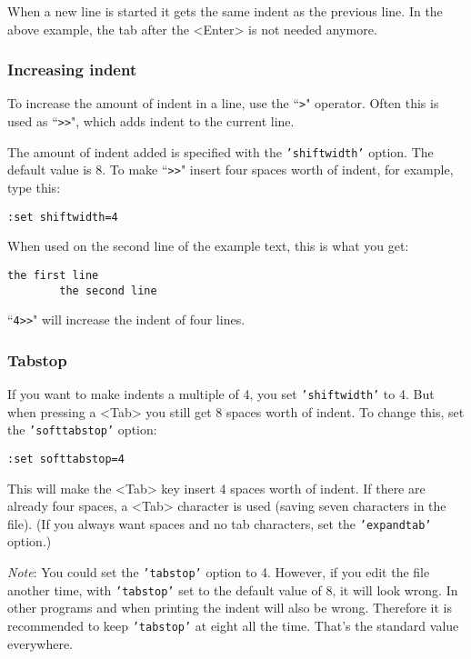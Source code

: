 When a new line is started it gets the same indent as the previous line.
In the above example, the tab after the <Enter> is not needed anymore.

\subsubsection{Increasing indent}
To increase the amount of indent in a line, use the ``\texttt{>}" operator.
Often this is used as ``\texttt{>>}", which adds indent to the current line.

The amount of indent added is specified with the \texttt{'shiftwidth'} option.
The default value is 8.
To make ``\texttt{>>}" insert four spaces worth of indent, for example, type this:

\begin{Verbatim}[samepage=true]
 :set shiftwidth=4
\end{Verbatim}

When used on the second line of the example text, this is what you get:

\begin{Verbatim}[samepage=true]
    the first line
        the second line
\end{Verbatim}

``\texttt{4>>}" will increase the indent of four lines.
\subsubsection{Tabstop}
If you want to make indents a multiple of 4, you set \texttt{'shiftwidth'} to 4.
But when pressing a <Tab> you still get 8 spaces worth of indent.
To change this, set the \texttt{'softtabstop'} option:

\begin{Verbatim}[samepage=true]
 :set softtabstop=4
\end{Verbatim}

This will make the <Tab> key insert 4 spaces worth of indent.
If there are already four spaces, a <Tab> character is used (saving seven characters in the file).
(If you always want spaces and no tab characters, set the \texttt{'expandtab'} option.)

\emph{Note}: You could set the \texttt{'tabstop'} option to 4.
However, if you edit the file another time, with \texttt{'tabstop'} set to the default value of 8, it will look wrong.
In other programs and when printing the indent will also be wrong.
Therefore it is recommended to keep \texttt{'tabstop'} at eight all the time.
That's the standard value everywhere.

